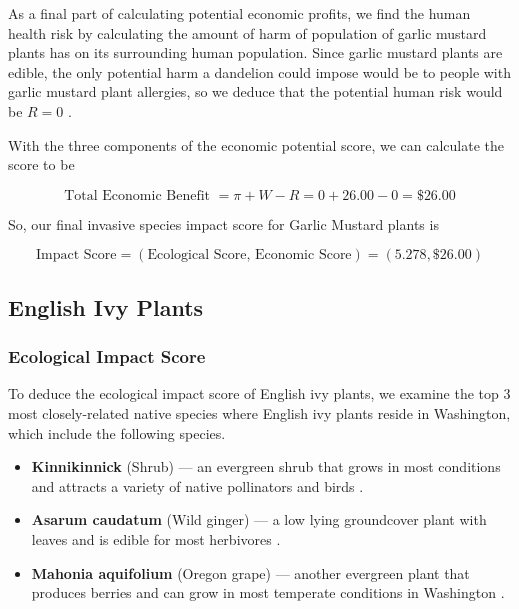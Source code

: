 As a final part of calculating potential economic profits, we find the human health risk by calculating the amount of harm of population of garlic mustard plants has on its surrounding human population. Since garlic mustard plants are edible, the only potential harm a dandelion could impose would be to people with garlic mustard plant allergies, so we deduce that the potential human risk would be \(R = 0\) \cite{fmrInvasiveSpecies}.

With the three components of the economic potential score, we can calculate the score to be 

\[\text{Total Economic Benefit } = \pi + W - R = 0 + 26.00 - 0 = \$26.00\]

So, our final invasive species impact score for Garlic Mustard plants is

\[\text{Impact Score} = (\text{Ecological Score, Economic Score}) = (5.278, \$26.00)\]

\subsection{English Ivy Plants}

\subsubsection{Ecological Impact Score}
To deduce the ecological impact score of English ivy plants, we examine the top 3 most closely-related native species where English ivy plants reside in Washington, which include the following species.

\begin{itemize}
    \item \textbf{Kinnikinnick} (Shrub) — an evergreen shrub that grows in most conditions and attracts a variety of native pollinators and birds \cite{wnpsPlantProfile}.
    \item \textbf{Asarum caudatum} (Wild ginger) — a low lying groundcover plant with leaves and is edible for most herbivores \cite{portlandnurseryAsarumCaudatum}.
    \item \textbf{Mahonia aquifolium} (Oregon grape) — another evergreen plant that produces berries and can grow in most temperate conditions in Washington \cite{oregonstateMahoniaAquifolium}.
\end{itemize}



